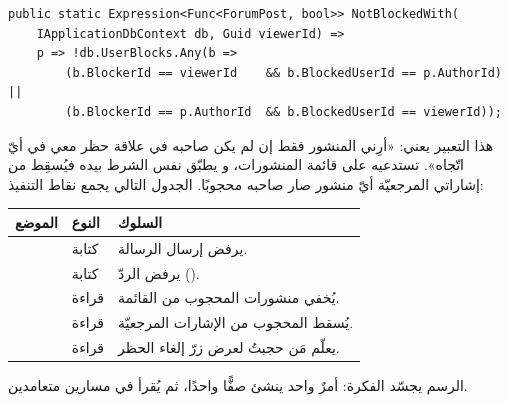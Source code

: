 \begin{english}
\begin{lstlisting}[language={[Sharp]C}]
public static Expression<Func<ForumPost, bool>> NotBlockedWith(
    IApplicationDbContext db, Guid viewerId) =>
    p => !db.UserBlocks.Any(b =>
        (b.BlockerId == viewerId    && b.BlockedUserId == p.AuthorId) ||
        (b.BlockerId == p.AuthorId  && b.BlockedUserId == viewerId));
\end{lstlisting}
\end{english}

هذا التعبير يعني: «أرِني المنشور فقط إن لم يكن صاحبه في علاقة حظر معي في أيّ اتّجاه».
تستدعيه  على قائمة المنشورات، و يطبّق نفس
الشرط بيده فيُسقِط من إشاراتي المرجعيّة أيّ منشور صار صاحبه محجوبًا. الجدول التالي يجمع
نقاط التنفيذ:

\begin{center}
\begin{tabular}{L{3.4cm} L{2.6cm} L{6cm}}
\toprule
الموضع & النوع & السلوك \\
\midrule
{} & كتابة & يرفض إرسال الرسالة. \\
 & كتابة & يرفض الردّ (). \\
 & قراءة & يُخفي منشورات المحجوب من القائمة. \\
 & قراءة & يُسقط المحجوب من الإشارات المرجعيّة. \\
 & قراءة & يعلّم مَن حجبتُ لعرض زرّ إلغاء الحظر. \\
\bottomrule
\end{tabular}
\end{center}

الرسم يجسّد الفكرة: أمرٌ واحد ينشئ صفًّا واحدًا، ثم يُقرأ في مسارين متعامدين.

\begin{center}
\begin{LTR}
\end{LTR}
\end{center}

